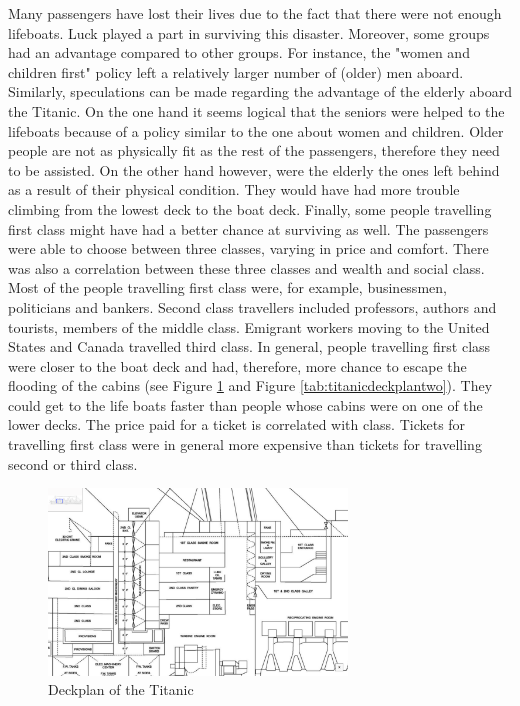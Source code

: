 \documentclass[11pt]{article}
\begin{document}
Many passengers have lost their lives due to the fact that there were not enough lifeboats. Luck played a part in surviving this disaster. Moreover, some groups had an advantage compared to other groups. For instance, the "women and children first" policy left a relatively larger number of (older) men aboard. Similarly, speculations can be made regarding the advantage of the elderly aboard the Titanic. On the one hand it seems logical that the seniors were helped to the lifeboats because of a policy similar to the one about women and children. Older people are not as physically fit as the rest of the passengers, therefore they need to be assisted. On the other hand however, were the elderly the ones left behind as a result of their physical condition. They would have had more trouble climbing from the lowest deck to the boat deck. Finally, some people travelling first class might have had a better chance at surviving as well. The passengers were able to choose between three classes, varying in price and comfort. There was also a correlation between these three classes and wealth and social class. Most of the people travelling first class were, for example, businessmen, politicians and bankers. Second class travellers included professors, authors and tourists, members of the middle class. Emigrant workers moving to the United States and Canada travelled third class. In general, people travelling first class were closer to the boat deck and had, therefore, more chance to escape the flooding of the cabins (see Figure \ref{tab:titanicdeckplanone} and Figure \ref{tab:titanicdeckplantwo}). They could get to the life boats faster than people whose cabins were on one of the lower decks. The price paid for a ticket is correlated with class. Tickets for travelling first class were in general more expensive than tickets for travelling second or third class. 

\begin{figure}[htbp]
\centering
\includegraphics[width=300px]{./Deck2.png}
\caption{\label{tab:titanicdeckplanone}
Deckplan of the Titanic}
\end{figure} 
\end{document}
